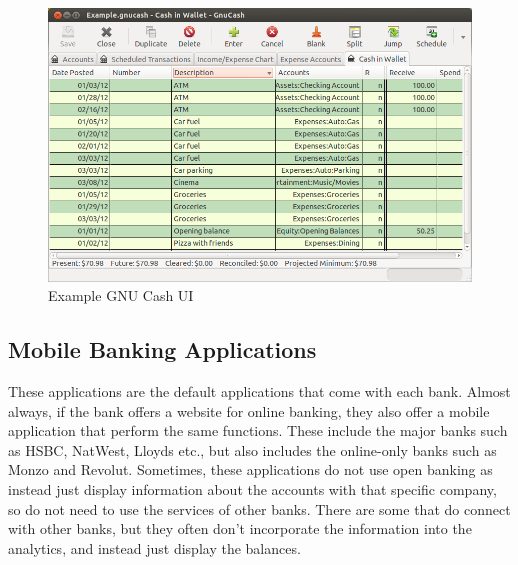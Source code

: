 \begin{figure}[H]
	\centering
    \includegraphics[width=\textwidth]{gnucash.png}
	\vspace{-0.8cm}
    \caption{Example GNU Cash UI \cite{GNUCashUI}}
    \label{fig:gnucash_ui}
\end{figure}

\subsection{Mobile Banking Applications}
\label{sec:mobile-banking-applications}
These applications are the default applications that come with each bank. Almost always, if the bank offers a website for online banking, they also offer a mobile application that perform the same functions. These include the major banks such as HSBC, NatWest, Lloyds etc., but also includes the online-only banks such as Monzo and Revolut. Sometimes, these applications do not use open banking as instead just display information about the accounts with that specific company, so do not need to use the services of other banks. There are some that do connect with other banks, but they often don't incorporate the information into the analytics, and instead just display the balances.

